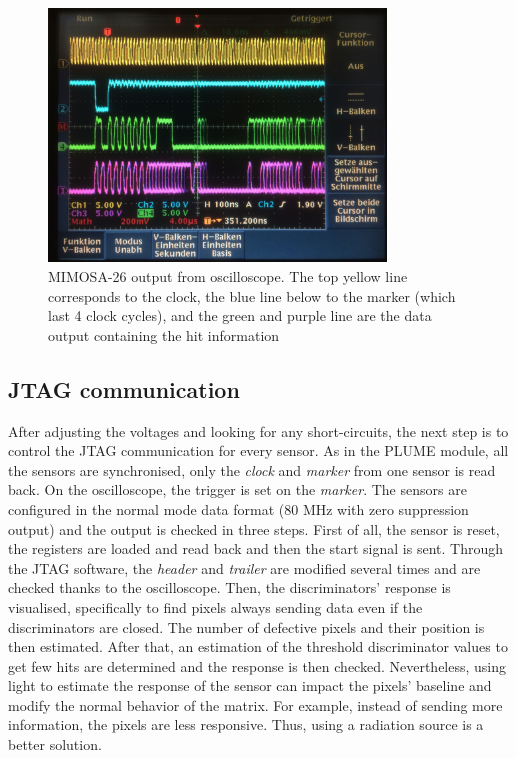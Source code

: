   \begin{figure}[h]
    \centering
    \includegraphics[width=0.8\textwidth]{Pictures/labTests/mi26_output}
    \caption{MIMOSA-26 output from oscilloscope. The top yellow line corresponds to the clock, the blue line below to the marker (which last 4 clock cycles), and the green and purple line are the data output containing the hit information}
    \label{fig:mi26Output}
  \end{figure}

  \subsection{JTAG communication}

  After adjusting the voltages and looking for any short-circuits, the next step is to control the JTAG communication for every sensor.
  As in the PLUME module, all the sensors are synchronised, only the \textit{clock} and \textit{marker} from one sensor is read back.
  On the oscilloscope, the trigger is set on the \textit{marker}.  
  The sensors are configured in the normal mode data format (80 MHz with zero suppression output) and the output is checked in three steps.
  First of all, the sensor is reset, the registers are loaded and read back and then the start signal is sent. 
  Through the JTAG software, the \textit{header} and \textit{trailer} are modified several times and are checked thanks to the oscilloscope.
  Then, the discriminators' response is visualised, specifically to find pixels always sending data even if the discriminators are closed.
  The number of defective pixels and their position is then estimated.
  After that, an estimation of the threshold discriminator values to get few hits are determined and the response is then checked.
  Nevertheless, using light to estimate the response of the sensor can impact the pixels' baseline and modify the normal behavior of the matrix.
  For example, instead of sending more information, the pixels are less responsive.
  Thus, using a radiation source is a better solution.

